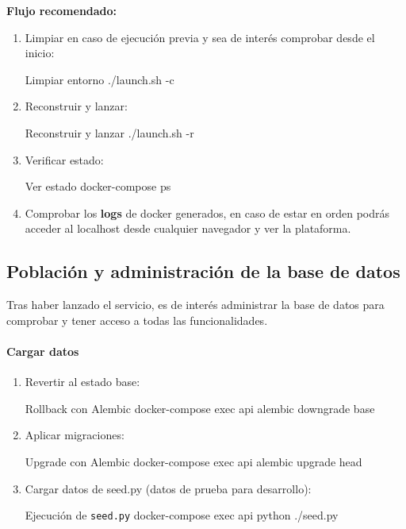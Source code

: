 \documentclass[12pt, a4paper]{article}
\begin{document}
\begin{umaappendices}
	\vspace{.5em}
	\textbf{Flujo recomendado:}
	\begin{enumerate}
		\item Limpiar en caso de ejecución previa y sea de interés comprobar desde el inicio:
		\begin{Terminal}{Limpiar entorno}
			./launch.sh -c
		\end{Terminal}
		\item Reconstruir y lanzar:
		\begin{Terminal}{Reconstruir y lanzar}
			./launch.sh -r
		\end{Terminal}
		\item Verificar estado:
		\begin{Terminal}{Ver estado}
			docker-compose ps
		\end{Terminal}
		\item Comprobar los \textbf{logs} de docker generados, en caso de estar en orden podrás acceder al localhost desde cualquier navegador y ver la plataforma. 
	\end{enumerate}
	
	\subsection{Población y administración de la base de datos}
	\label{sec:seed_db}
	
	Tras haber lanzado el servicio, es de interés administrar la base de datos para comprobar y tener acceso a todas las funcionalidades.
	
	\paragraph{Cargar datos}
	\begin{enumerate}
		\item Revertir al estado base:
		\begin{Terminal}{Rollback con Alembic}
			docker-compose exec api alembic downgrade base
		\end{Terminal}
		\item Aplicar migraciones:
		\begin{Terminal}{Upgrade con Alembic}
			docker-compose exec api alembic upgrade head
		\end{Terminal}
		\item Cargar datos de seed.py (datos de prueba para desarrollo):
		\begin{Terminal}{Ejecución de \texttt{seed.py}}
			docker-compose exec api python ./seed.py
		\end{Terminal}
	\end{enumerate}
	

\end{umaappendices}
\end{document}

